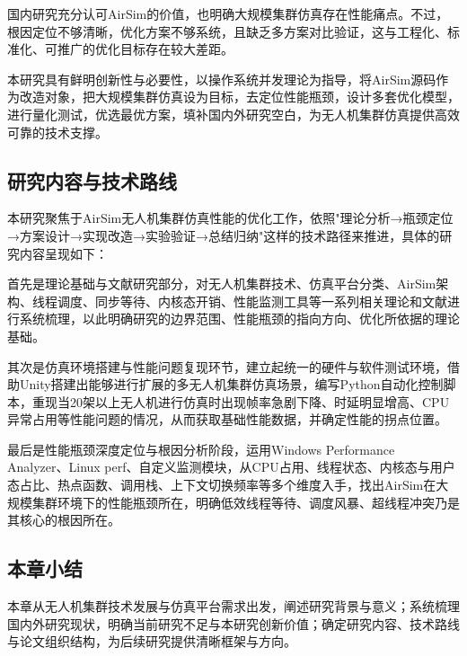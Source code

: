 国内研究充分认可AirSim的价值，也明确大规模集群仿真存在性能痛点。不过，根因定位不够清晰，优化方案不够系统，且缺乏多方案对比验证，这与工程化、标准化、可推广的优化目标存在较大差距。

本研究具有鲜明创新性与必要性，以操作系统并发理论为指导，将AirSim源码作为改造对象，把大规模集群仿真设为目标，去定位性能瓶颈，设计多套优化模型，进行量化测试，优选最优方案，填补国内外研究空白，为无人机集群仿真提供高效可靠的技术支撑。

\subsection{研究内容与技术路线}

本研究聚焦于AirSim无人机集群仿真性能的优化工作，依照"理论分析→瓶颈定位→方案设计→实现改造→实验验证→总结归纳"这样的技术路径来推进，具体的研究内容呈现如下：

首先是理论基础与文献研究部分，对无人机集群技术、仿真平台分类、AirSim架构、线程调度、同步等待、内核态开销、性能监测工具等一系列相关理论和文献进行系统梳理，以此明确研究的边界范围、性能瓶颈的指向方向、优化所依据的理论基础。

其次是仿真环境搭建与性能问题复现环节，建立起统一的硬件与软件测试环境，借助Unity搭建出能够进行扩展的多无人机集群仿真场景，编写Python自动化控制脚本，重现当20架以上无人机进行仿真时出现帧率急剧下降、时延明显增高、CPU异常占用等性能问题的情况，从而获取基础性能数据，并确定性能的拐点位置。

最后是性能瓶颈深度定位与根因分析阶段，运用Windows Performance Analyzer、Linux perf、自定义监测模块，从CPU占用、线程状态、内核态与用户态占比、热点函数、调用栈、上下文切换频率等多个维度入手，找出AirSim在大规模集群环境下的性能瓶颈所在，明确低效线程等待、调度风暴、超线程冲突乃是其核心的根因所在。

\subsection{本章小结}

本章从无人机集群技术发展与仿真平台需求出发，阐述研究背景与意义；系统梳理国内外研究现状，明确当前研究不足与本研究创新价值；确定研究内容、技术路线与论文组织结构，为后续研究提供清晰框架与方向。
